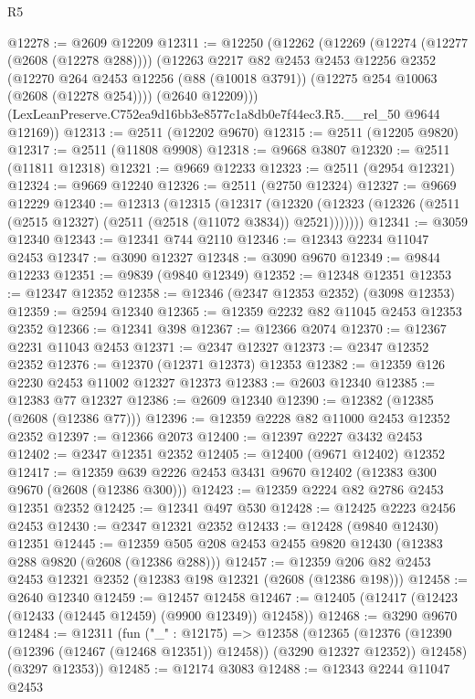 \begin{lexlean}{R5}
\begin{coremodule}
@12278 := @2609 @12209
@12311 := @12250
    (@12262
      (@12269
        (@12274 (@12277 (@2608 (@12278 @288))))
        (@12263
          @2217
          @82
          @2453
          @2453
          @12256
          @2352
          (@12270 @264 @2453 @12256 (@88 (@10018 @3791)) (@12275 @254 @10063 (@2608 (@12278 @254))))
          (@2640 @12209)))
      (LexLeanPreserve.C752ea9d16bb3e8577c1a8db0e7f44ec3.R5.__rel_50 @9644 @12169))
@12313 := @2511 (@12202 @9670)
@12315 := @2511 (@12205 @9820)
@12317 := @2511 (@11808 @9908)
@12318 := @9668 @3807
@12320 := @2511 (@11811 @12318)
@12321 := @9669 @12233
@12323 := @2511 (@2954 @12321)
@12324 := @9669 @12240
@12326 := @2511 (@2750 @12324)
@12327 := @9669 @12229
@12340 := @12313
    (@12315
      (@12317
        (@12320 (@12323 (@12326 (@2511 (@2515 @12327) (@2511 (@2518 (@11072 @3834)) @2521)))))))
@12341 := @3059 @12340
@12343 := @12341 @744 @2110
@12346 := @12343 @2234 @11047 @2453
@12347 := @3090 @12327
@12348 := @3090 @9670
@12349 := @9844 @12233
@12351 := @9839 (@9840 @12349)
@12352 := @12348 @12351
@12353 := @12347 @12352
@12358 := @12346 (@2347 @12353 @2352) (@3098 @12353)
@12359 := @2594 @12340
@12365 := @12359 @2232 @82 @11045 @2453 @12353 @2352
@12366 := @12341 @398
@12367 := @12366 @2074
@12370 := @12367 @2231 @11043 @2453
@12371 := @2347 @12327
@12373 := @2347 @12352 @2352
@12376 := @12370 (@12371 @12373) @12353
@12382 := @12359 @126 @2230 @2453 @11002 @12327 @12373
@12383 := @2603 @12340
@12385 := @12383 @77 @12327
@12386 := @2609 @12340
@12390 := @12382 (@12385 (@2608 (@12386 @77)))
@12396 := @12359 @2228 @82 @11000 @2453 @12352 @2352
@12397 := @12366 @2073
@12400 := @12397 @2227 @3432 @2453
@12402 := @2347 @12351 @2352
@12405 := @12400 (@9671 @12402) @12352
@12417 := @12359 @639 @2226 @2453 @3431 @9670 @12402 (@12383 @300 @9670 (@2608 (@12386 @300)))
@12423 := @12359 @2224 @82 @2786 @2453 @12351 @2352
@12425 := @12341 @497 @530
@12428 := @12425 @2223 @2456 @2453
@12430 := @2347 @12321 @2352
@12433 := @12428 (@9840 @12430) @12351
@12445 := @12359 @505 @208 @2453 @2455 @9820 @12430 (@12383 @288 @9820 (@2608 (@12386 @288)))
@12457 := @12359 @206 @82 @2453 @2453 @12321 @2352 (@12383 @198 @12321 (@2608 (@12386 @198)))
@12458 := @2640 @12340
@12459 := @12457 @12458
@12467 := @12405 (@12417 (@12423 (@12433 (@12445 @12459) (@9900 @12349)) @12458))
@12468 := @3290 @9670
@12484 := @12311
    (fun ("_" : @12175) =>
    @12358
      (@12365
        (@12376 (@12390 (@12396 (@12467 (@12468 @12351)) @12458)) (@3290 @12327 @12352))
        @12458)
      (@3297 @12353))
@12485 := @12174 @3083
@12488 := @12343 @2244 @11047 @2453

\end{coremodule}
\end{lexlean}
